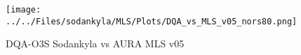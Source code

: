 
                                \begin{figure}
        \centering
\texttt{[image: ../../Files/sodankyla/MLS/Plots/DQA\_vs\_MLS\_v05\_nors80.png]}
    \caption{DQA-O3S Sodankyla vs AURA MLS v05 }
            \label{fig:o3sv05}
    \end{figure}











%
%

